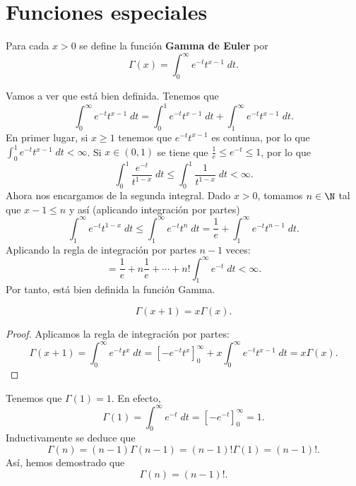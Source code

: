 \section{Funciones especiales}
\begin{fdefinition}
\normalfont Para cada $\displaystyle x > 0 $ se define la función \textbf{Gamma de Euler} por
\[ \Gamma\left(x\right) = \int^{\infty}_{0} e^{-t}t ^{x-1} \; dt .\]
\end{fdefinition}
Vamos a ver que está bien definida. Tenemos que
\[\int^{\infty}_{0} e^{-t}t ^{x-1} \; dt = \int^{1}_{0} e^{-t}t ^{x-1} \; dt + \int^{\infty}_{1} e^{-t}t ^{x-1} \; dt .\]
En primer lugar, si $\displaystyle x \geq 1 $ tenemos que $\displaystyle e^{-t}t ^{x-1} $ es continua, por lo que $\displaystyle \int^{1}_{0} e^{-t}t ^{x-1} \; dt < \infty $. Si $\displaystyle x \in \left(0,1\right) $ se tiene que $\displaystyle \frac{1}{e} \leq e^{-t} \leq 1 $, por lo que
\[\int^{1}_{0} \frac{e^{-t}}{t ^{1-x}} \; dt \leq \int^{1}_{0} \frac{1}{t ^{1-x}} \; dt < \infty .\]
Ahora nos encargamos de la segunda integral. Dado $\displaystyle x > 0 $, tomamos $\displaystyle n \in \N $ tal que $\displaystyle x - 1 \leq n $ y así (aplicando integración por partes)
\[\int^{\infty}_{1} e^{-t}t ^{1-x} \; dt \leq \int^{\infty}_{1} e^{-t}t ^{n} \; dt = \frac{1}{e} + \int^{\infty}_{1} e^{-t}t ^{n-1} \; dt .\]
Aplicando la regla de integración por partes $\displaystyle n - 1 $ veces:
\[ = \frac{1}{e} + n \frac{1}{e} + \cdots + n!\int^{\infty}_{1} e^{-t} \; dt < \infty.\]
Por tanto, está bien definida la función Gamma.
\begin{fprop}[]
\normalfont 
\[\Gamma\left(x+1\right) = x\Gamma\left(x\right) .\]
\end{fprop}
\begin{proof}
Aplicamos la regla de integración por partes:
\[\Gamma\left(x+1\right) = \int^{\infty}_{0} e^{-t}t ^{x} \; dt = \left[-e^{-t}t ^{x}\right] ^{\infty}_{0}+x\int^{\infty}_{0} e^{-t}t ^{x-1} \; dt = x\Gamma\left(x\right) .\]
\end{proof}
\begin{observation}
\normalfont Tenemos que $\displaystyle \Gamma\left(1\right) = 1 $. En efecto,
\[\Gamma\left(1\right) = \int^{\infty}_{0} e^{-t} \; dt = \left[-e^{-t}\right] ^{\infty}_{0} = 1 .\]
Inductivamente se deduce que
\[\Gamma\left(n\right) = \left(n-1\right)\Gamma\left(n-1\right) = \left(n-1\right)!\Gamma\left(1\right)=\left(n-1\right)! .\]
Así, hemos demostrado que 
\[\boxed{\Gamma\left(n\right) = \left(n-1\right)!} .\]
\end{observation}
